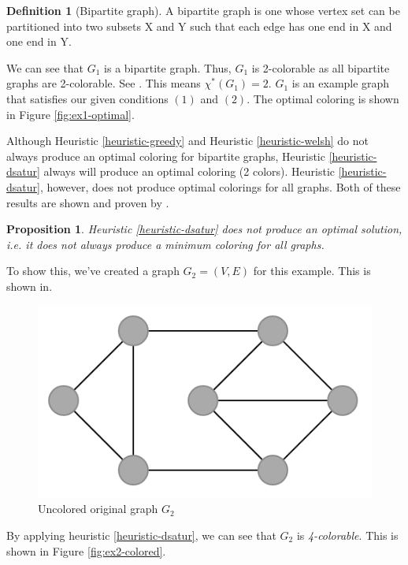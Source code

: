 \documentclass{article}
\newcounter{heuristic} \setcounter{heuristic}{0}
\newtheorem{prop}{Proposition}
\theoremstyle{definition}
\newtheorem{definition}{Definition}
\begin{document}
\begin{definition}[Bipartite graph]
A bipartite graph is one whose vertex set can be partitioned into two subsets X and Y such that each edge has one end in X and one end in Y.
\end{definition}

We can see that $G_1$ is a bipartite graph. Thus, \(G_1\) is 2-colorable as all bipartite graphs are 2-colorable. See \citet{asratian1998bipartite}. This means \(\chi^{*}(G_1) = 2\). \(G_1\) is an example graph that satisfies our given conditions \((1)\) and \((2)\). The optimal coloring is shown in Figure \ref{fig:ex1-optimal}.



Although Heuristic \ref{heuristic-greedy} and Heuristic \ref{heuristic-welsh} do not always produce an optimal coloring for bipartite graphs, Heuristic \ref{heuristic-dsatur} always will produce an optimal coloring (2 colors). Heuristic \ref{heuristic-dsatur}, however, does not produce optimal colorings for all graphs. Both of these results are shown and proven by \citet{brelaz}.

\begin{prop}
Heuristic \ref{heuristic-dsatur} does not produce an optimal solution, i.e. it does not always produce a minimum coloring for all graphs.
\end{prop}

To show this, we've created a graph $G_2 = (V, E)$ for this example. This is shown in.

\begin{figure}[H]
\centering
\includegraphics[scale=0.5]{images/dsatur-1.png}
\caption{Uncolored original graph \(G_2\)}\label{fig:ex2-uncolored}
\end{figure}

By applying heuristic \ref{heuristic-dsatur}, we can see that $G_2$ is \emph{4-colorable}. This is shown in Figure \ref{fig:ex2-colored}.
\end{document}
